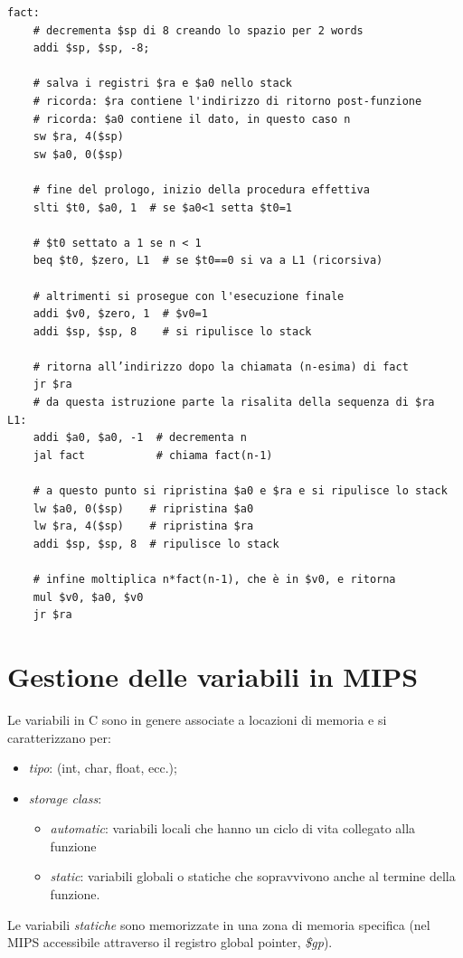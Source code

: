 \documentclass[class=book, crop=false]{standalone}
\begin{document}
\begin{verbatim}
fact:
	# decrementa $sp di 8 creando lo spazio per 2 words
	addi $sp, $sp, -8;

	# salva i registri $ra e $a0 nello stack
	# ricorda: $ra contiene l'indirizzo di ritorno post-funzione
	# ricorda: $a0 contiene il dato, in questo caso n
	sw $ra, 4($sp)
	sw $a0, 0($sp)

	# fine del prologo, inizio della procedura effettiva
	slti $t0, $a0, 1  # se $a0<1 setta $t0=1

	# $t0 settato a 1 se n < 1
	beq $t0, $zero, L1  # se $t0==0 si va a L1 (ricorsiva)

	# altrimenti si prosegue con l'esecuzione finale
	addi $v0, $zero, 1  # $v0=1
	addi $sp, $sp, 8    # si ripulisce lo stack

	# ritorna all’indirizzo dopo la chiamata (n-esima) di fact
	jr $ra
	# da questa istruzione parte la risalita della sequenza di $ra
L1:
	addi $a0, $a0, -1  # decrementa n
	jal fact           # chiama fact(n-1)

	# a questo punto si ripristina $a0 e $ra e si ripulisce lo stack
	lw $a0, 0($sp)    # ripristina $a0
	lw $ra, 4($sp)    # ripristina $ra
	addi $sp, $sp, 8  # ripulisce lo stack

	# infine moltiplica n*fact(n-1), che è in $v0, e ritorna
	mul $v0, $a0, $v0
	jr $ra
\end{verbatim}

\section{Gestione delle variabili in MIPS}
Le variabili in C sono in genere associate a locazioni di memoria e si caratterizzano per:
\begin{itemize}
	\item \emph{tipo}: (int, char, float, ecc.);
	\item \emph{storage class}:
	\begin{itemize}
		\item \emph{automatic}: variabili locali che hanno un ciclo di vita collegato alla funzione
		\item \emph{static}: variabili globali o statiche che sopravvivono anche al termine della funzione.
	\end{itemize}
\end{itemize}

Le variabili \emph{statiche} sono memorizzate in una zona di memoria specifica (nel MIPS accessibile attraverso il registro global pointer, \emph{\$gp}).
\end{document}
